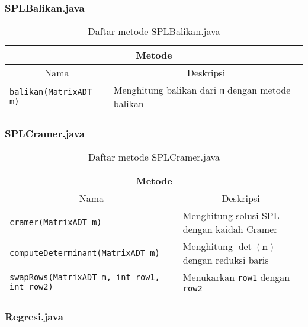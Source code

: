 \subsubsection{SPLBalikan.java}

\begin{table}[H]
    \centering
    \caption{Daftar metode SPLBalikan.java}
    \begin{tabular}{p{}|p{}}
        \hline
        \hline
        \multicolumn{2}{c}{\textbf{Metode}}\\
        \hline
        \hline
        \multicolumn{1}{c|}{Nama}  & \multicolumn{1}{c}{Deskripsi} \\
        \hline 
        \hline 
        \texttt{balikan(MatrixADT m)} & Menghitung balikan dari \verb+m+ dengan metode balikan
    \end{tabular}
\end{table}

\subsubsection{SPLCramer.java}

\begin{table}[H]
    \centering
    \caption{Daftar metode SPLCramer.java}
    \begin{tabular}{p{}|p{}}
        \hline
        \hline
        \multicolumn{2}{c}{\textbf{Metode}}\\
        \hline
        \hline
        \multicolumn{1}{c|}{Nama}  & \multicolumn{1}{c}{Deskripsi} \\
        \hline 
        \hline 
        \texttt{cramer(MatrixADT m)} & Menghitung solusi SPL dengan kaidah Cramer \\[.5em]
        \texttt{computeDeterminant(MatrixADT m)} & Menghitung $\det(\texttt{m})$ dengan reduksi baris \\[.5em]
        \texttt{swapRows(MatrixADT m, int row1, int row2)} & Menukarkan \verb+row1+ dengan \verb+row2+ 
    \end{tabular}
\end{table}

\subsubsection{Regresi.java}

